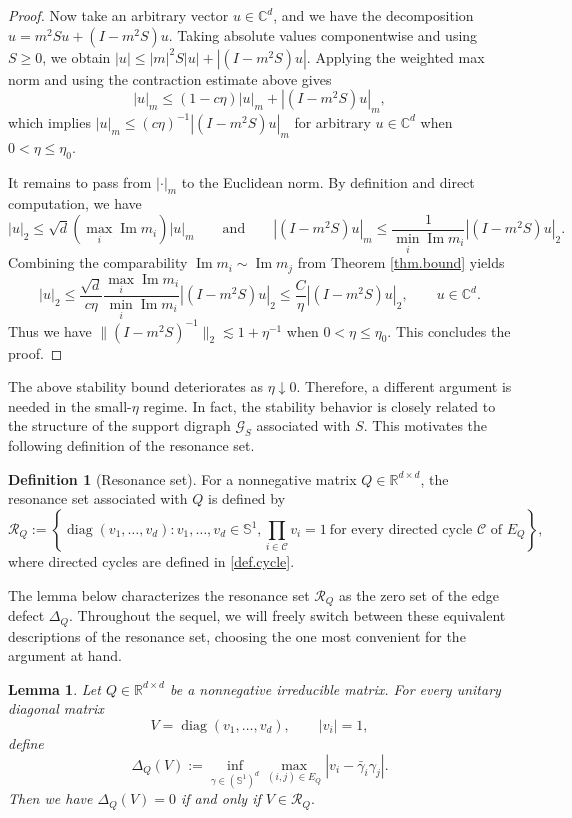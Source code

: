 \documentclass[11pt,twoside, a4paper]{article}
\numberwithin{equation}{section}
\numberwithin{figure}{section}
\theoremstyle{plain} %
\newtheorem{lemma}[theorem]{Lemma}
\theoremstyle{definition}
\newtheorem{definition}[theorem]{Definition}
\theoremstyle{remark}
\newcommand{\1} {\mspace{1 mu}}
\newcommand{\2} {\mspace{2 mu}}
\newcommand{\C} {{\mathbb{C}}}
\DeclareMathOperator{\im}{Im}
\DeclareMathOperator{\diag}{diag}
\begin{document}
\begin{proof}
Now take an arbitrary vector \(u\in\mathbb{C}^d\), and we have the decomposition
$
    u=m^2Su+ (I-m^2S)u.
$
Taking absolute values componentwise and using \(S\ge0\), we obtain
$
    |u|\le|m|^2S|u|+|(I-m^2S)u|.
$
Applying the weighted max norm and using the contraction estimate above gives
\[
    |u|_m
    \le
    (1-c\eta)|u|_m+|(I-m^2S)u|_m,
\]
which implies 
$
    |u|_m
    \le
    (c\eta)^{-1}|(I-m^2S)u|_m 
$
for arbitrary $u\in\C^d$ when $0<\eta\le\eta_0$.

It remains to pass from \(|\cdot|_m\) to the Euclidean norm. By definition and direct computation, we have 
\[
    |u|_2
    \le
    \sqrt{d}(\max_i \im m_i)|u|_m\qquad\text{and}\qquad  |(I-m^2S)u|_m
    \le
    \frac{1}{\min_i \im m_i}|(I-m^2S)u|_2 .
\]
Combining the comparability $\im m_i\sim\im m_j$ from Theorem \ref{thm.bound} yields
\[
    |u|_2
    \le
    \frac{\sqrt{d}}{c\eta}
    \frac{\max_i \im m_i}{\min_i \im m_i}
    |(I-m^2S)u|_2
    \le
    \frac{C}{\eta}|(I-m^2S)u|_2,\qquad u\in\C^d.
\]
Thus we have
$
    \|(I-m^2S)^{-1}\|_2\lesssim 1+\eta^{-1}
$
when $0<\eta\le\eta_0$. This concludes the proof.
\end{proof}
\bigskip
The above stability bound deteriorates as \(\eta\downarrow 0\). Therefore, a different argument is needed in the small-\(\eta\) regime. 
In fact, the stability behavior is closely related to the structure of the support digraph $\mathcal{G}_S$ associated with $S$. This motivates the following definition of the resonance set.




\begin{definition}[Resonance set]\label{def.resonance set}
For a nonnegative matrix \(Q\in \mathbb R^{d\times d}\), the resonance set associated with \(Q\) is defined by
\[
\mathscr{R}_Q
:=
\left\{
\diag(v_1,\dots,v_d):
v_1,\dots,v_d\in \mathbb S^1,
\prod_{i\in \mathscr{C}} v_i = 1~
\text{for every directed cycle } \mathscr{C} \text{ of } E_Q
\right\},
\]
where directed cycles are defined in \eqref{def.cycle}.
\end{definition}





The lemma below characterizes the resonance set \(\mathscr R_Q\) as the zero set of the edge defect \(\Delta_Q\). 
Throughout the sequel, we will freely switch between these equivalent descriptions of the resonance set, choosing the one most convenient for the argument at hand.

\begin{lemma}\label{lem.zero-set-of-edge-defect}
Let \(Q\in \mathbb R^{d\times d}\) be a nonnegative irreducible matrix. For every unitary diagonal matrix 
\[
V=\diag(v_1,\dots,v_d),\qquad |v_i|=1,
\]
define
\[
\Delta_Q(V)
:=
\inf_{\gamma\in (\mathbb S^1)^d}
\max_{(i,j)\in E_Q}
|v_i-\bar\gamma_i\gamma_j|.
\]
Then we have
$
\Delta_Q(V)=0$ if and only if $ V\in \mathscr{R}_Q.
$
\end{lemma}
\end{document}
